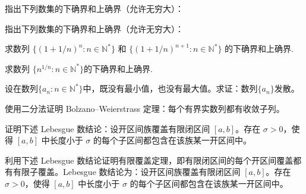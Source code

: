 \noindent\begin{minipage}{\textwidth}
指出下列数集的下确界和上确界（允许无穷大）：
\end{minipage}\par\vfill
\noindent\begin{minipage}{\textwidth}
指出下列数集的下确界和上确界（允许无穷大）：
\end{minipage}\par\vfill
\newpage
\noindent\begin{minipage}{\textwidth}
求数列  $ \{(1+1/n)^n: n\in\mathbb{N}^*\} $ 和  $ \{(1+1/n)^{n+1}: n\in\mathbb{N}^*\} $ 的下确界和上确界.
\end{minipage}\par\vfill
\noindent\begin{minipage}{\textwidth}
求数列 $ \{n^{1/n}\colon n\in\mathbb{N}^*\} $的下确界和上确界.
\end{minipage}\par\vfill
\noindent\begin{minipage}{\textwidth}
设在数列$\{a_n: n \in \mathbb{N}^*\}$中，既没有最小值，也没有最大值。求证：数列$\{a_n\}$发散。
\end{minipage}\par\vfill
\newpage
\noindent\begin{minipage}{\textwidth}
使用二分法证明 Bolzano--Weierstrass 定理：每个有界实数列都有收敛子列。
\end{minipage}\par\vfill
\noindent\begin{minipage}{\textwidth}
证明下述 Lebesgue 数结论：设开区间族覆盖有限闭区间 $[a,b]$。存在 $\sigma>0$，使得 $[a,b]$ 中长度小于 $\sigma$ 的每个子区间都包含在该族某一开区间中。
\end{minipage}\par\vfill
\noindent\begin{minipage}{\textwidth}
利用下述 Lebesgue 数结论证明有限覆盖定理，即有限闭区间的每个开区间覆盖都有有限子覆盖。Lebesgue 数结论为：设开区间族覆盖有限闭区间 $[a,b]$。存在 $\sigma>0$，使得 $[a,b]$ 中长度小于 $\sigma$ 的每个子区间都包含在该族某一开区间中。
\end{minipage}\par\vfill
